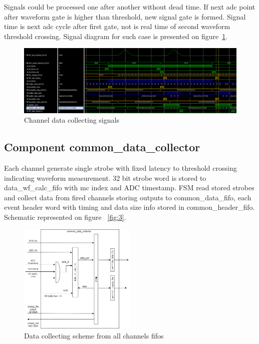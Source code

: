 \documentclass{article}
\begin{document}
Signals could be processed one after another without dead time. If next adc point after waveform gate is higher than threshold, new signal gate is formed. Signal time is next adc cycle after first gate, not is real time of second waveform threshold crossing. Signal diagram for such case is presented on figure~\ref{fig:5}.


\begin{figure}[H]
	\centering 
	\includegraphics[width=1.0\textwidth]{ADC_ch_data_collector_wave_pileup.png}
	\caption{\label{fig:5} Channel data collecting signals}
\end{figure}



\subsection{Component common\_data\_collector}
Each channel generate single strobe with fixed latency to threshold crossing indicating waveform measurement. 32 bit strobe word is stored to data\_wf\_calc\_fifo with mc index and ADC timestamp. FSM read stored strobes and collect data from fired channels storing outputs to common\_data\_fifo, each event header word with timing and data size info stored in common\_header\_fifo. Schematic represented on figure ~\ref{fig:3}.

\begin{figure}[H]
	\centering 
	\includegraphics[width=0.5\textwidth]{ADC_common_event_collection.png}
	\caption{\label{fig:6} Data collecting scheme from all channels fifos}
\end{figure}
\end{document}
